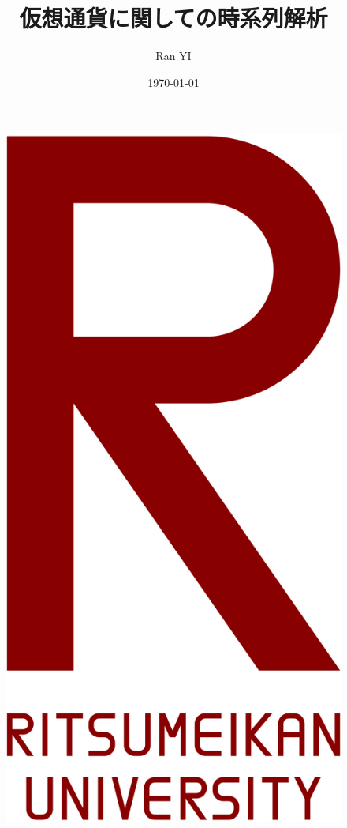 \documentclass{beamer}  %
\author{Ran YI}
\title{仮想通貨に関しての時系列解析}
\subtitle{}
\institute{
    Department of Mathematical Sciences \\
    Ritsumeikan University
}
\date{\today}
\begin{document}
\begin{frame}
    \titlepage
    \begin{figure}[h]
        \begin{center}
            \includegraphics[keepaspectratio, scale=0.017]{pic/Ritsumeikan_University_Logo.png}
        \end{center}
    \end{figure}
\end{frame}
\end{document}
